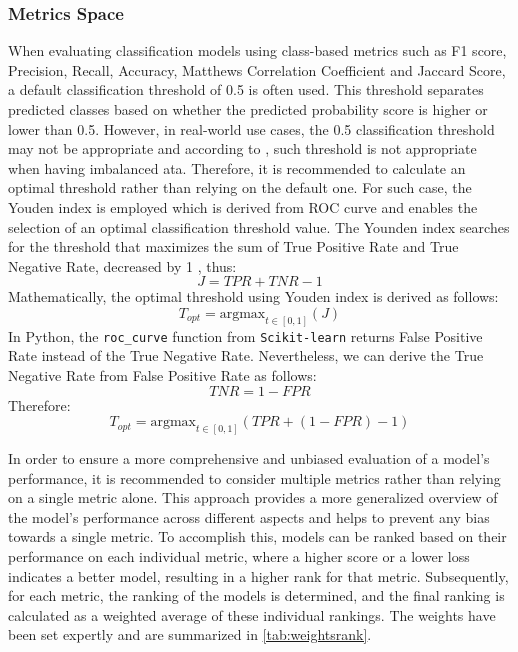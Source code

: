 \subsubsection{Metrics Space}

When evaluating classification models using class-based metrics such as F1 score, Precision, Recall, Accuracy, Matthews Correlation Coefficient and Jaccard Score, a default classification threshold of 0.5 is often used. This threshold separates predicted classes based on whether the predicted probability score is higher or lower than 0.5.
However, in real-world use cases, the 0.5 classification threshold may not be appropriate and according to \citep{esposito2021ghost}, such threshold is not appropriate when having imbalanced ata. Therefore, it is recommended to calculate an optimal threshold rather than relying on the default one.
For such case, the Youden index is employed which is derived from ROC curve and enables the selection of an optimal classification threshold value. 
The Younden index searches for the threshold that maximizes the sum of True Positive Rate and True Negative Rate, decreased by 1 \citep{fluss2005estimation}, thus:
\begin{equation}\label{eq}
J = TPR + TNR - 1
\end{equation}
Mathematically, the optimal threshold using Youden index is derived as follows:
\begin{equation}\label{eq}
T_{opt} = \text{argmax}_{t \in [0, 1]}\left(J\right)
\end{equation}
In Python, the \lstinline{roc_curve} function from \lstinline{Scikit-learn} returns False Positive Rate instead of the True Negative Rate. Nevertheless, we can derive the True Negative Rate from False Positive Rate as follows:
\begin{equation}\label{eq}
TNR =  1-FPR
\end{equation}
Therefore:
\begin{equation}\label{eq}
T_{opt} = \text{argmax}_{t \in [0, 1]}\left(TPR +  \left(1-FPR\right) - 1\right)
\end{equation}

In order to ensure a more comprehensive and unbiased evaluation of a model's performance, it is recommended to consider multiple metrics rather than relying on a single metric alone. This approach provides a more generalized overview of the model's performance across different aspects and helps to prevent any bias towards a single metric.
To accomplish this, models can be ranked based on their performance on each individual metric, where a higher score or a lower loss indicates a better model, resulting in a higher rank for that metric. Subsequently, for each metric, the ranking of the models is determined, and the final ranking is calculated as a weighted average of these individual rankings.
The weights have been set expertly and are summarized in \autoref{tab:weightsrank}.


